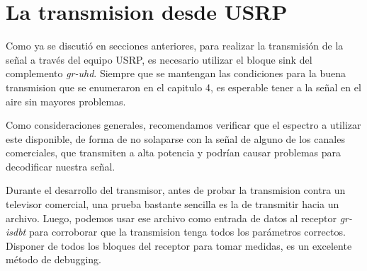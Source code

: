 \section{La transmision desde USRP}

Como ya se discutió en secciones anteriores, para realizar la transmisión de la señal a través del equipo USRP, es necesario utilizar el bloque sink del complemento \textit{gr-uhd}. Siempre que se mantengan las condiciones para la buena transmision que se enumeraron en el capitulo 4, es esperable tener a la señal en el aire sin mayores problemas. 

Como consideraciones generales, recomendamos verificar que el espectro a utilizar este disponible, de forma de no solaparse con la señal de alguno de los canales comerciales, que transmiten a alta potencia y podrían causar problemas para decodificar nuestra señal.

Durante el desarrollo del transmisor, antes de probar la transmision contra un televisor comercial, una prueba bastante sencilla es la de transmitir hacia un archivo. Luego, podemos usar ese archivo como entrada de datos al receptor \textit{gr-isdbt} para corroborar que la transmision tenga todos los parámetros correctos. Disponer de todos los bloques del receptor para tomar medidas, es un excelente método de debugging.